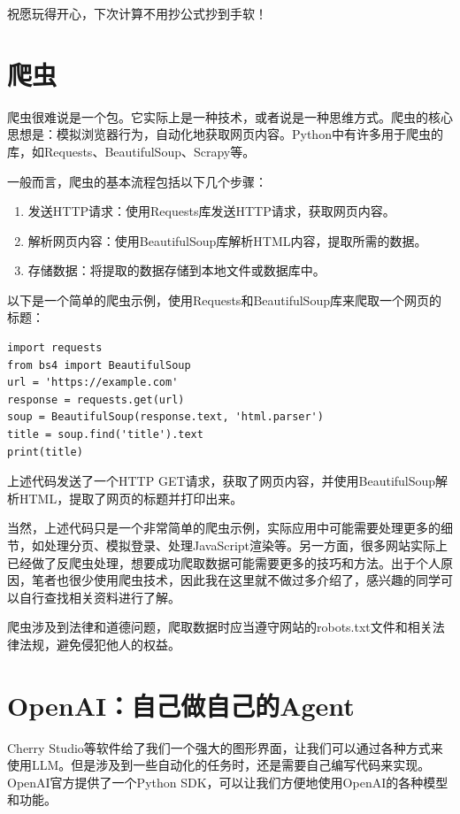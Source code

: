 祝愿玩得开心，下次计算不用抄公式抄到手软！

\section{爬虫}

爬虫很难说是一个包。它实际上是一种技术，或者说是一种思维方式。爬虫的核心思想是：模拟浏览器行为，自动化地获取网页内容。Python中有许多用于爬虫的库，如Requests、BeautifulSoup、Scrapy等。

一般而言，爬虫的基本流程包括以下几个步骤：
\begin{enumerate}
  \item 发送HTTP请求：使用Requests库发送HTTP请求，获取网页内容。
  \item 解析网页内容：使用BeautifulSoup库解析HTML内容，提取所需的数据。
  \item 存储数据：将提取的数据存储到本地文件或数据库中。
\end{enumerate}
以下是一个简单的爬虫示例，使用Requests和BeautifulSoup库来爬取一个网页的标题：
\begin{verbatim}
import requests
from bs4 import BeautifulSoup
url = 'https://example.com'
response = requests.get(url)
soup = BeautifulSoup(response.text, 'html.parser')
title = soup.find('title').text
print(title)
\end{verbatim}
上述代码发送了一个HTTP GET请求，获取了网页内容，并使用BeautifulSoup解析HTML，提取了网页的标题并打印出来。

当然，上述代码只是一个非常简单的爬虫示例，实际应用中可能需要处理更多的细节，如处理分页、模拟登录、处理JavaScript渲染等。另一方面，很多网站实际上已经做了反爬虫处理，想要成功爬取数据可能需要更多的技巧和方法。出于个人原因，笔者也很少使用爬虫技术，因此我在这里就不做过多介绍了，感兴趣的同学可以自行查找相关资料进行了解。

\begin{caution}
  爬虫涉及到法律和道德问题，爬取数据时应当遵守网站的robots.txt文件和相关法律法规，避免侵犯他人的权益。
\end{caution}

\section{OpenAI：自己做自己的Agent}

Cherry Studio等软件给了我们一个强大的图形界面，让我们可以通过各种方式来使用LLM。但是涉及到一些自动化的任务时，还是需要自己编写代码来实现。OpenAI官方提供了一个Python SDK，可以让我们方便地使用OpenAI的各种模型和功能。

